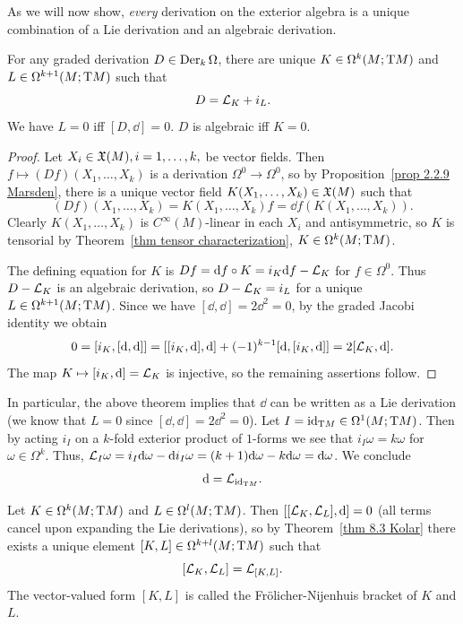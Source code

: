 As we will now show, \emph{every} derivation on the exterior algebra is a unique combination of a Lie derivation and an algebraic derivation.

\begin{thm}\label{thm 8.3 Kolar}
    For any graded derivation $D\in\operatorname{Der}_k\Omega$, there are unique $K\in\Omega^k(M;\mathrm{T} M)$ and $L\in\Omega^{k+1}(M;\mathrm{T} M)$ such that 
    \[D=\mathcal{L}_K+i_L.\]
    We have $L=0$ iff $[D,\dd]=0$. $D$ is algebraic iff $K=0$.
\end{thm}
\begin{proof}
    Let $X_i\in\mathfrak{X}(M),i=1,\ldots,k,$ be vector fields. Then $f\mapsto (Df)(X_1,\ldots,X_k)$ is a derivation $\Omega^0\to \Omega^0$, so by Proposition~\ref{prop 2.2.9 Marsden}, there is a unique vector field $K(X_1,\ldots,X_k)\in\mathfrak{X}(M)$ such that 
    \[(Df)(X_1,\ldots,X_k)=K(X_1,\ldots,X_k)f=\dd f(K(X_1,\ldots,X_k)).\]
    Clearly $K(X_1,\ldots,X_k)$ is $C^\infty(M)$-linear in each $X_i$ and antisymmetric, so $K$ is tensorial by Theorem~\ref{thm tensor characterization}, $K\in\Omega^k(M;\mathrm{T} M)$.

    The defining equation for $K$ is $Df={\mathrm{d}} f\circ K=i_K{\mathrm{d}} f-\mathcal{L}_K$ for $f\in\Omega^0$. Thus $D-\mathcal{L}_K$ is an algebraic derivation, so $D-\mathcal{L}_K=i_L$ for a unique $L\in\Omega^{k+1}(M;\mathrm{T} M)$. Since we have $[\dd,\dd]=2\dd^2=0$, by the graded Jacobi identity we obtain
    \[0=[i_K,[{\mathrm{d}},{\mathrm{d}}]]=[[i_K,{\mathrm{d}}],{\mathrm{d}}]+(-1)^{k-1}[{\mathrm{d}},[i_K,{\mathrm{d}}]]=2[\mathcal{L}_K,{\mathrm{d}}].\]
    The map $K\mapsto [i_K,{\mathrm{d}}]=\mathcal{L}_K$ is injective, so the remaining assertions follow.
\end{proof}


\begin{rem}
    In particular, the above theorem implies that $\dd$ can be written as a Lie derivation (we know that $L=0$ since $[\dd,\dd]=2\dd^2=0$). Let $I=\operatorname{id}_{\mathrm{T} M}\in\Omega^1(M;\mathrm{T} M)$. Then by acting $i_I$ on a $k$-fold exterior product of $1$-forms we see that $i_I \omega=k\omega$ for $\omega\in\Omega^k$. Thus, $\mathcal{L}_{I}\omega=i_I{\mathrm{d}}\omega-{\mathrm{d}} i_I\omega=(k+1){\mathrm{d}}\omega-k{\mathrm{d}}\omega={\mathrm{d}}\omega$. We conclude
    \[{\mathrm{d}}=\mathcal{L}_{\operatorname{id}_{\mathrm{T} M}}.\]
\end{rem}

\begin{defn}
    Let $K\in\Omega^k(M;\mathrm{T} M)$ and $L\in\Omega^l(M;\mathrm{T} M)$. Then $[[\mathcal{L}_K,\mathcal{L}_L],{\mathrm{d}}]=0$ (all terms cancel upon expanding the Lie derivations), so by Theorem~\ref{thm 8.3 Kolar} there exists a unique element $[K,L]\in \Omega^{k+l}(M;\mathrm{T} M)$ such that 
    \[[\mathcal{L}_K,\mathcal{L}_L]=\mathcal{L}_{[K,L]}.\]
    The vector-valued form $[K,L]$ is called the Fr\"olicher-Nijenhuis bracket of $K$ and $L$.
\end{defn}


